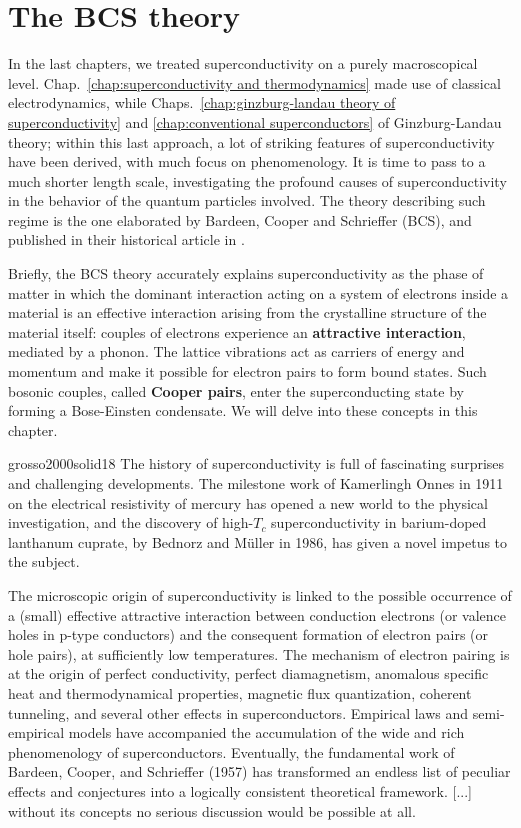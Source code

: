 \chapter{The BCS theory}\chaptertoc{}\label{chap: the bcs theory}

In the last chapters, we treated superconductivity on a purely macroscopical level. Chap.~\ref{chap:superconductivity and thermodynamics} made use of classical electrodynamics, while Chaps.~\ref{chap:ginzburg-landau theory of superconductivity} and \ref{chap:conventional superconductors} of Ginzburg-Landau theory; within this last approach, a lot of striking features of superconductivity have been derived, with much focus on phenomenology. It is time to pass to a much shorter length scale, investigating the profound causes of superconductivity in the behavior of the quantum particles involved. The theory describing such regime is the one elaborated by Bardeen, Cooper and Schrieffer (BCS), and published in their historical article  \cite{PhysRev.108.1175} in \citeyear{PhysRev.108.1175}.

Briefly, the BCS theory accurately explains superconductivity as the phase of matter in which the dominant interaction acting on a system of electrons inside a material is an effective interaction arising from the crystalline structure of the material itself: couples of electrons experience an \textbf{attractive interaction}, mediated by a phonon. The lattice vibrations act as carriers of energy and momentum and make it possible for electron pairs to form bound states. Such bosonic couples, called \textbf{Cooper pairs}, enter the superconducting state by forming a Bose-Einsten condensate. We will delve into these concepts in this chapter.

\begin{cit}{grosso2000solid}{18}
	The history of superconductivity is full of fascinating surprises and challenging developments. The milestone work of Kamerlingh Onnes in 1911 on the electrical resistivity of mercury has opened a new world to the physical investigation, and the discovery of high-$T_c$ superconductivity in barium-doped lanthanum cuprate, by Bednorz and Müller in 1986, has given a novel impetus to the subject. 
	
	The microscopic origin of superconductivity is linked to the possible occurrence of a (small) effective attractive interaction between conduction electrons (or valence holes in p-type conductors) and the consequent formation of electron pairs (or hole pairs), at sufficiently low temperatures. The mechanism of electron pairing is at the origin of perfect conductivity, perfect diamagnetism, anomalous specific heat and thermodynamical properties, magnetic flux quantization, coherent tunneling, and several other effects in superconductors. Empirical laws and semi-empirical models have accompanied the accumulation of the wide and rich phenomenology of superconductors. Eventually, the fundamental work of Bardeen, Cooper, and Schrieffer (1957) has transformed an endless list of peculiar effects and conjectures into a logically consistent theoretical framework. [...] without its concepts no serious discussion would be possible at all.
\end{cit}

